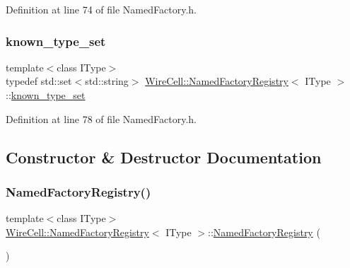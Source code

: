 Definition at line 74 of file Named\+Factory.\+h.

\mbox{\label{class_wire_cell_1_1_named_factory_registry_a166047268e8cb29c0ea05ae35a80db0c}} 
\subsubsection{\texorpdfstring{known\+\_\+type\+\_\+set}{known\_type\_set}}
{\footnotesize\ttfamily template$<$class I\+Type$>$ \\
typedef std\+::set$<$std\+::string$>$ \hyperlink{class_wire_cell_1_1_named_factory_registry}{Wire\+Cell\+::\+Named\+Factory\+Registry}$<$ I\+Type $>$\+::\hyperlink{class_wire_cell_1_1_named_factory_registry_a166047268e8cb29c0ea05ae35a80db0c}{known\+\_\+type\+\_\+set}}



Definition at line 78 of file Named\+Factory.\+h.



\subsection{Constructor \& Destructor Documentation}
\mbox{\label{class_wire_cell_1_1_named_factory_registry_ab8ee15e6702c7714b712c213e07ea3c6}} 
\subsubsection{\texorpdfstring{Named\+Factory\+Registry()}{NamedFactoryRegistry()}}
{\footnotesize\ttfamily template$<$class I\+Type$>$ \\
\hyperlink{class_wire_cell_1_1_named_factory_registry}{Wire\+Cell\+::\+Named\+Factory\+Registry}$<$ I\+Type $>$\+::\hyperlink{class_wire_cell_1_1_named_factory_registry}{Named\+Factory\+Registry} (\begin{DoxyParamCaption}{ }\end{DoxyParamCaption})\hspace{0.3cm}{\ttfamily [inline]}}



